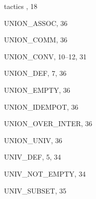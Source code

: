 \begin{theindex}
  \indexspace

  \item tactics
    , 18

  \indexspace

  \item {\ptt UNION\_ASSOC}, 36
  \item {\ptt UNION\_COMM}, 36
  \item {\ptt UNION\_CONV}, 10--12, 31
  \item {\ptt UNION\_DEF}, 7, 36
  \item {\ptt UNION\_EMPTY}, 36
  \item {\ptt UNION\_IDEMPOT}, 36
  \item {\ptt UNION\_OVER\_INTER}, 36
  \item {\ptt UNION\_UNIV}, 36
  \item {\ptt UNIV\_DEF}, 5, 34
  \item {\ptt UNIV\_NOT\_EMPTY}, 34
  \item {\ptt UNIV\_SUBSET}, 35

\end{theindex}

